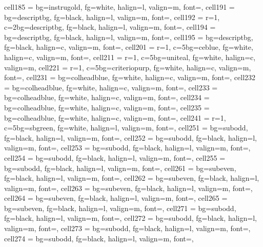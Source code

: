 \documentclass[a4paper,12pt]{article}
\begin{document}
\begin{longtblr}
{  cell{18}{5} = {bg=instrugold, fg=white, halign=l, valign=m, font=\footnotesize},
  cell{19}{1} = {bg=descriptbg, fg=black, halign=l, valign=m, font=\footnotesize},
  cell{19}{2} = {r=1, c=2}{bg=descriptbg, fg=black, halign=l, valign=m, font=\footnotesize},
  cell{19}{4} = {bg=descriptbg, fg=black, halign=l, valign=m, font=\footnotesize},
  cell{19}{5} = {bg=descriptbg, fg=black, halign=c, valign=m, font=\footnotesize\bfseries},
  cell{20}{1} = {r=1, c=5}{bg=ceblue, fg=white, halign=c, valign=m, font=\small\bfseries},
  cell{21}{1} = {r=1, c=5}{bg=uniteal, fg=white, halign=c, valign=m},
  cell{22}{1} = {r=1, c=5}{bg=criteriopurp, fg=white, halign=c, valign=m, font=\small\bfseries},
  cell{23}{1} = {bg=colheadblue, fg=white, halign=c, valign=m, font=\bfseries},
  cell{23}{2} = {bg=colheadblue, fg=white, halign=c, valign=m, font=\bfseries},
  cell{23}{3} = {bg=colheadblue, fg=white, halign=c, valign=m, font=\bfseries},
  cell{23}{4} = {bg=colheadblue, fg=white, halign=c, valign=m, font=\bfseries},
  cell{23}{5} = {bg=colheadblue, fg=white, halign=c, valign=m, font=\bfseries},
  cell{24}{1} = {r=1, c=5}{bg=sbgreen, fg=white, halign=l, valign=m, font=\small\bfseries},
  cell{25}{1} = {bg=subodd,  fg=black, halign=l, valign=m, font=\footnotesize},
  cell{25}{2} = {bg=subodd,  fg=black, halign=l, valign=m, font=\footnotesize},
  cell{25}{3} = {bg=subodd,  fg=black, halign=l, valign=m, font=\footnotesize},
  cell{25}{4} = {bg=subodd,  fg=black, halign=l, valign=m, font=\footnotesize},
  cell{25}{5} = {bg=subodd,  fg=black, halign=l, valign=m, font=\footnotesize},
  cell{26}{1} = {bg=subeven, fg=black, halign=l, valign=m, font=\footnotesize},
  cell{26}{2} = {bg=subeven, fg=black, halign=l, valign=m, font=\footnotesize},
  cell{26}{3} = {bg=subeven, fg=black, halign=l, valign=m, font=\footnotesize},
  cell{26}{4} = {bg=subeven, fg=black, halign=l, valign=m, font=\footnotesize},
  cell{26}{5} = {bg=subeven, fg=black, halign=l, valign=m, font=\footnotesize},
  cell{27}{1} = {bg=subodd,  fg=black, halign=l, valign=m, font=\footnotesize},
  cell{27}{2} = {bg=subodd,  fg=black, halign=l, valign=m, font=\footnotesize},
  cell{27}{3} = {bg=subodd,  fg=black, halign=l, valign=m, font=\footnotesize},
  cell{27}{4} = {bg=subodd,  fg=black, halign=l, valign=m, font=\footnotesize},
}
\end{longtblr}
\end{document}
